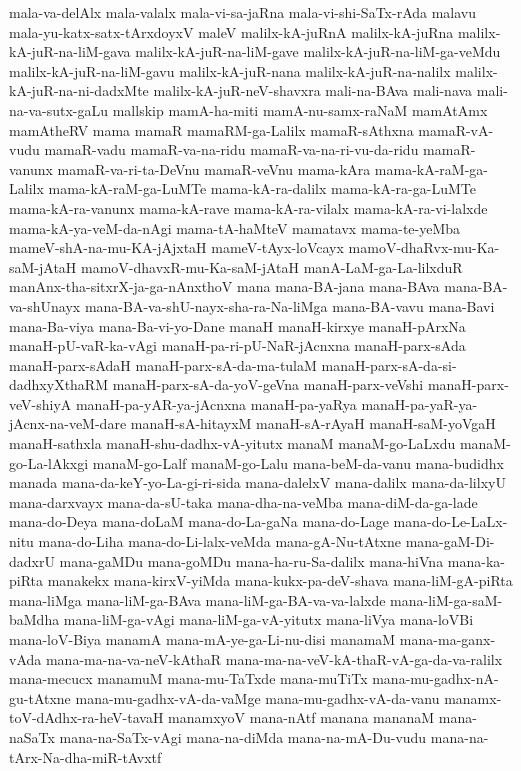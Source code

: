{mala-va-delAlx
mala-valalx
mala-vi-sa-jaRna
mala-vi-shi-SaTx-rAda
malavu
mala-yu-katx-satx-tArxdoyxV
maleV
malilx-kA-juRnA
malilx-kA-juRna
malilx-kA-juR-na-liM-gava
malilx-kA-juR-na-liM-gave
malilx-kA-juR-na-liM-ga-veMdu
malilx-kA-juR-na-liM-gavu
malilx-kA-juR-nana
malilx-kA-juR-na-nalilx
malilx-kA-juR-na-ni-dadxMte
malilx-kA-juR-neV-shavxra
mali-na-BAva
mali-nava
mali-na-va-sutx-gaLu
mallskip
mamA-ha-miti
mamA-nu-samx-raNaM
mamAtAmx
mamAtheRV
mama
mamaR
mamaRM-ga-Lalilx
mamaR-sAthxna
mamaR-vA-vudu
mamaR-vadu
mamaR-va-na-ridu
mamaR-va-na-ri-vu-da-ridu
mamaR-vanunx
mamaR-va-ri-ta-DeVnu
mamaR-veVnu
mama-kAra
mama-kA-raM-ga-Lalilx
mama-kA-raM-ga-LuMTe
mama-kA-ra-dalilx
mama-kA-ra-ga-LuMTe
mama-kA-ra-vanunx
mama-kA-rave
mama-kA-ra-vilalx
mama-kA-ra-vi-lalxde
mama-kA-ya-veM-da-nAgi
mama-tA-haMteV
mamatavx
mama-te-yeMba
mameV-shA-na-mu-KA-jAjxtaH
mameV-tAyx-loVcayx
mamoV-dhaRvx-mu-Ka-saM-jAtaH
mamoV-dhavxR-mu-Ka-saM-jAtaH
manA-LaM-ga-La-lilxduR
manAnx-tha-sitxrX-ja-ga-nAnxthoV
mana
mana-BA-jana
mana-BAva
mana-BA-va-shUnayx
mana-BA-va-shU-nayx-sha-ra-Na-liMga
mana-BA-vavu
mana-Bavi
mana-Ba-viya
mana-Ba-vi-yo-Dane
manaH
manaH-kirxye
manaH-pArxNa
manaH-pU-vaR-ka-vAgi
manaH-pa-ri-pU-NaR-jAcnxna
manaH-parx-sAda
manaH-parx-sAdaH
manaH-parx-sA-da-ma-tulaM
manaH-parx-sA-da-si-dadhxyXthaRM
manaH-parx-sA-da-yoV-geVna
manaH-parx-veVshi
manaH-parx-veV-shiyA
manaH-pa-yAR-ya-jAcnxna
manaH-pa-yaRya
manaH-pa-yaR-ya-jAcnx-na-veM-dare
manaH-sA-hitayxM
manaH-sA-rAyaH
manaH-saM-yoVgaH
manaH-sathxla
manaH-shu-dadhx-vA-yitutx
manaM
manaM-go-LaLxdu
manaM-go-La-lAkxgi
manaM-go-Lalf
manaM-go-Lalu
mana-beM-da-vanu
mana-budidhx
manada
mana-da-keY-yo-La-gi-ri-sida
mana-dalelxV
mana-dalilx
mana-da-lilxyU
mana-darxvayx
mana-da-sU-taka
mana-dha-na-veMba
mana-diM-da-ga-lade
mana-do-Deya
mana-doLaM
mana-do-La-gaNa
mana-do-Lage
mana-do-Le-LaLx-nitu
mana-do-Liha
mana-do-Li-lalx-veMda
mana-gA-Nu-tAtxne
mana-gaM-Di-dadxrU
mana-gaMDu
mana-goMDu
mana-ha-ru-Sa-dalilx
mana-hiVna
mana-ka-piRta
manakekx
mana-kirxV-yiMda
mana-kukx-pa-deV-shava
mana-liM-gA-piRta
mana-liMga
mana-liM-ga-BAva
mana-liM-ga-BA-va-va-lalxde
mana-liM-ga-saM-baMdha
mana-liM-ga-vAgi
mana-liM-ga-vA-yitutx
mana-liVya
mana-loVBi
mana-loV-Biya
manamA
mana-mA-ye-ga-Li-nu-disi
manamaM
mana-ma-ganx-vAda
mana-ma-na-va-neV-kAthaR
mana-ma-na-veV-kA-thaR-vA-ga-da-va-ralilx
mana-mecucx
manamuM
mana-mu-TaTxde
mana-muTiTx
mana-mu-gadhx-nA-gu-tAtxne
mana-mu-gadhx-vA-da-vaMge
mana-mu-gadhx-vA-da-vanu
manamx-toV-dAdhx-ra-heV-tavaH
manamxyoV
mana-nAtf
manana
mananaM
mana-naSaTx
mana-na-SaTx-vAgi
mana-na-diMda
mana-na-mA-Du-vudu
mana-na-tArx-Na-dha-miR-tAvxtf
}
